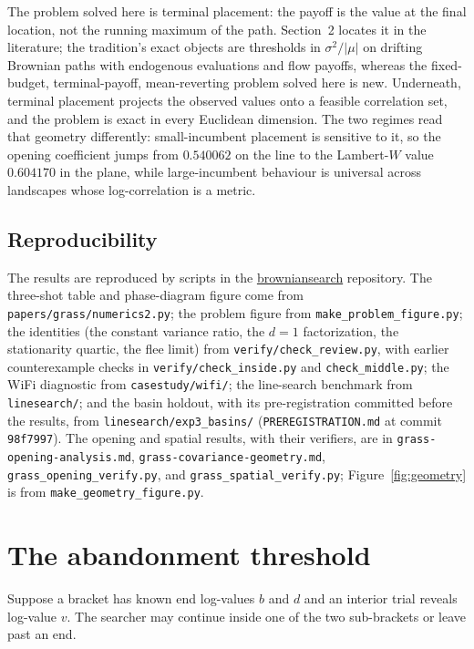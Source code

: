 \documentclass[11pt]{article}
\theoremstyle{itheads}
\begin{document}
The problem solved here is terminal placement: the payoff is the
value at the final location, not the running maximum of the path.
Section~2 locates it in the literature; the tradition's exact objects
are thresholds in $\sigma^{2}/|\mu|$ on drifting Brownian paths with
endogenous evaluations and flow payoffs, whereas the fixed-budget,
terminal-payoff, mean-reverting problem solved here is new. Underneath, terminal
placement projects the observed values onto a feasible correlation set,
and the problem is exact in every Euclidean dimension. The two regimes
read that geometry differently: small-incumbent placement is sensitive
to it, so the opening coefficient jumps from $0.540062$ on the line to
the Lambert-$W$ value $0.604170$ in the plane, while large-incumbent
behaviour is universal across landscapes whose log-correlation is a
metric.

\subsection*{Reproducibility}

The results are reproduced by scripts in the
\href{https://github.com/microprediction/browniansearch}{browniansearch}
repository. The three-shot table and phase-diagram figure come from
\texttt{papers/grass/numerics2.py}; the problem figure from
\texttt{make\_problem\_figure.py}; the identities (the constant
variance ratio, the $d=1$ factorization, the stationarity quartic,
the flee limit) from \texttt{verify/check\_review.py}, with earlier
counterexample checks in \texttt{verify/check\_inside.py} and
\texttt{check\_middle.py}; the WiFi diagnostic from
\texttt{casestudy/wifi/}; the line-search benchmark from
\texttt{linesearch/}; and the basin holdout, with its
pre-registration committed before the results, from
\texttt{linesearch/exp3\_basins/} (\texttt{PREREGISTRATION.md} at
commit \texttt{98f7997}). The opening and spatial results, with their
verifiers, are in \texttt{grass-opening-analysis.md},
\texttt{grass-covariance-geometry.md}, \texttt{grass\_opening\_verify.py},
and \texttt{grass\_spatial\_verify.py}; Figure~\ref{fig:geometry} is from
\texttt{make\_geometry\_figure.py}.

\appendix
\section{The abandonment threshold}\label{app:abandon}

Suppose a bracket has known end log-values $b$ and $d$ and an
interior trial reveals log-value $v$. The searcher may continue
inside one of the two sub-brackets or leave past an end.
\end{document}
